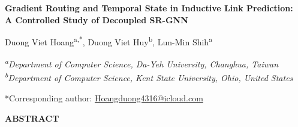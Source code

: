 \documentclass[a4paper,10pt]{article}
\renewcommand{\normalsize}{\fontsize{9}{13.5}\selectfont}
\begin{document}
\normalsize
\begin{center}
{\fontsize{18}{23}\selectfont\bfseries Gradient Routing and Temporal State in Inductive Link Prediction:\\ A Controlled Study of Decoupled SR-GNN\par}
\vspace{12pt}
{\fontsize{10}{15}\selectfont Duong Viet Hoang\textsuperscript{a,*}, Duong Viet Huy\textsuperscript{b}, Lun-Min Shih\textsuperscript{a}\par}
\vspace{6pt}
{\itshape\textsuperscript{a}Department of Computer Science, Da-Yeh University, Changhua, Taiwan\\
\textsuperscript{b}Department of Computer Science, Kent State University, Ohio, United States\par}
\vspace{6pt}
*Corresponding author: \href{mailto:Hoangduong4316@icloud.com}{Hoangduong4316@icloud.com}
\end{center}
\vspace{18pt}
\begin{center}\fontsize{11}{16.5}\selectfont\bfseries ABSTRACT\end{center}
\end{document}
